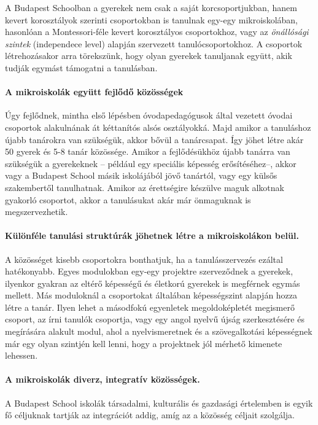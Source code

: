     A Budapest Schoolban a gyerekek nem csak a saját korcsoportjukban, hanem kevert korosztályok szerinti csoportokban is tanulnak egy-egy mikroiskolában, hasonlóan a Montessori-féle kevert korosztályos csoportokhoz, vagy az \emph{önállósági szintek} (independece level\cite{indepence_level}) alapján szervezett tanulócsoportokhoz. A csoportok létrehozásakor arra törekszünk, hogy olyan gyerekek tanuljanak együtt, akik tudják egymást támogatni a tanulásban.  

  \paragraph{A mikroiskolák együtt fejlődő közösségek}

    Úgy fejlődnek, mintha első lépésben óvodapedagógusok által vezetett óvodai csoportok
    alakulnának át kéttanítós alsós osztályokká. Majd amikor a tanuláshoz újabb
    tanárokra van szükségük, akkor bővül a tanárcsapat. Így jöhet létre akár 50 gyerek és 5-8
    tanár közössége. Amikor a fejlődésükhöz újabb tanárra van szükségük a
    gyerekeknek -- például egy speciális képesség erősítéséhez--, akkor vagy a
    Budapest School másik iskolájából jövő tanártól, vagy egy külsős szakembertől
    tanulhatnak. Amikor az érettségire készülve maguk alkotnak gyakorló csoportot, akkor a tanulásukat akár már önmaguknak is megszervezhetik. 

  \paragraph{Különféle tanulási struktúrák jöhetnek létre a mikroiskolákon belül.}

    A közösséget kisebb csoportokra bonthatjuk, ha a tanulásszervezés ezáltal
    hatékonyabb. Egyes modulokban egy-egy projektre szerveződnek a gyerekek,
    ilyenkor gyakran az eltérő képességű és életkorú gyerekek is megférnek egymás
    mellett. Más moduloknál a csoportokat általában képességszint alapján hozza
    létre a tanár. Ilyen lehet a másodfokú egyenletek megoldoképletét megismerő
    csoport, az írni tanulók csoportja, vagy egy angol nyelvű újság szerkesztésére
    és megírására alakult modul, ahol a nyelvismeretnek és a szövegalkotási
    képességnek már egy olyan szintjén kell lenni, hogy a projektnek jól mérhető
    kimenete lehessen.

  \paragraph{A mikroiskolák diverz, integratív közösségek.} A Budapest School iskolák társadalmi,
  kulturális és gazdasági értelemben is egyik fő céljuknak tartják az integrációt addig,
  amíg az a közösség céljait szolgálja.

